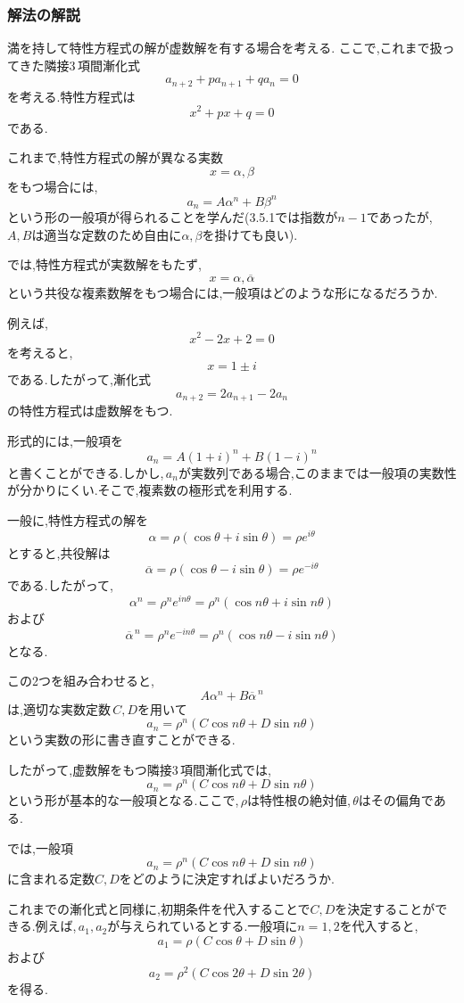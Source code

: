 \subsubsection{解法の解説}
  満を持して特性方程式の解が虚数解を有する場合を考える.
  ここで,これまで扱ってきた隣接3\,項間漸化式
  \[
    a_{n+2}+pa_{n+1}+qa_n=0
  \]
  を考える.特性方程式は
  \[
    x^2+px+q=0
  \]
  である.

  これまで,特性方程式の解が異なる実数
  \[
    x=\alpha,\beta
  \]
  をもつ場合には,
  \[
    a_n=A\alpha^n+B\beta^n
  \]
  という形の一般項が得られることを学んだ(3.5.1では指数が$n-1$であったが,\,$A,B$は適当な定数のため自由に$\alpha,\beta$を掛けても良い).

  では,特性方程式が実数解をもたず,
  \[
    x=\alpha,\overline{\alpha}
  \]
  という共役な複素数解をもつ場合には,一般項はどのような形になるだろうか.

  例えば,
  \[
    x^2-2x+2=0
  \]
  を考えると,
  \[
    x=1\pm i
  \]
  である.したがって,漸化式
  \[
    a_{n+2}=2a_{n+1}-2a_n
  \]
  の特性方程式は虚数解をもつ.

  形式的には,一般項を
  \[
    a_n=A(1+i)^n+B(1-i)^n
  \]
  と書くことができる.しかし,\,$a_n$が実数列である場合,このままでは一般項の実数性が分かりにくい.そこで,複素数の極形式を利用する.

  一般に,特性方程式の解を
  \[
    \alpha=\rho(\cos\theta+i\sin\theta)=\rho e^{i\theta}
  \]
  とすると,共役解は
  \[
    \overline{\alpha}=\rho(\cos\theta-i\sin\theta)=\rho e^{-i\theta}
  \]
  である.したがって,
  \[
    \alpha^n=\rho^n e^{in\theta}
    =\rho^n(\cos n\theta+i\sin n\theta)
  \]
  および
  \[
    \overline{\alpha}^{\,n}
    =\rho^n e^{-in\theta}
    =\rho^n(\cos n\theta-i\sin n\theta)
  \]
  となる.

  この2つを組み合わせると,
  \[
    A\alpha^n+B\overline{\alpha}^{\,n}
  \]
  は,適切な実数定数\,$C,D$を用いて
  \[
    a_n=\rho^n(C\cos n\theta+D\sin n\theta)
  \]
  という実数の形に書き直すことができる.

  したがって,虚数解をもつ隣接3\,項間漸化式では,
  \[
    a_n=\rho^n(C\cos n\theta+D\sin n\theta)
  \]
  という形が基本的な一般項となる.ここで,\,$\rho$は特性根の絶対値,\,$\theta$はその偏角である.

  では,一般項
  \[
    a_n=\rho^n(C\cos n\theta+D\sin n\theta)
  \]
  に含まれる定数$C,D$をどのように決定すればよいだろうか.

  これまでの漸化式と同様に,初期条件を代入することで$C,D$を決定することができる.例えば,\,$a_1,a_2$が与えられているとする.一般項に$n=1,2$を代入すると,
  \[
    a_1=\rho(C\cos\theta+D\sin\theta)
  \]
  および
  \[
    a_2=\rho^2(C\cos2\theta+D\sin2\theta)
  \]
  を得る.

